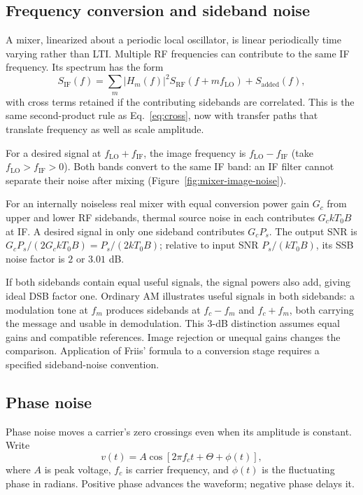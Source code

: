 \subsection{Frequency conversion and sideband noise}
A mixer, linearized about a periodic local oscillator, is linear periodically time varying rather than LTI. Multiple RF frequencies can contribute to the same IF frequency. Its spectrum has the form
\[
S_{\mathrm{IF}}(f)=\sum_m|H_m(f)|^2S_{\mathrm{RF}}(f+mf_{\mathrm{LO}})+S_{\mathrm{added}}(f),
\]
with cross terms retained if the contributing sidebands are correlated. This is the same second-product rule as Eq.~\eqref{eq:cross}, now with transfer paths that translate frequency as well as scale amplitude.

For a desired signal at $f_{\mathrm{LO}}+f_{\mathrm{IF}}$, the image frequency is $f_{\mathrm{LO}}-f_{\mathrm{IF}}$ (take $f_{\mathrm{LO}}>f_{\mathrm{IF}}>0$). Both bands convert to the same IF band: an IF filter cannot separate their noise after mixing (Figure~\ref{fig:mixer-image-noise}).
\MixerImageNoiseFigure

For an internally noiseless real mixer with equal conversion power gain $G_c$ from upper and lower RF sidebands, thermal source noise in each contributes $G_ckT_0B$ at IF. A desired signal in only one sideband contributes $G_cP_s$. The output SNR is $G_cP_s/(2G_ckT_0B)=P_s/(2kT_0B)$; relative to input SNR $P_s/(kT_0B)$, its SSB noise factor is $2$ or $3.01$ dB. 

If both sidebands contain equal useful signals, the signal powers also add, giving ideal DSB factor one. Ordinary AM illustrates useful signals in both sidebands: a modulation tone at $f_m$ produces sidebands at $f_c-f_m$ and $f_c+f_m$, both carrying the message and usable in demodulation. This $3$-dB distinction assumes equal gains and compatible references. Image rejection or unequal gains changes the comparison. Application of Friis' formula to a conversion stage requires a specified sideband-noise convention.

\subsection{Phase noise}
\label{sec:phase-noise}
Phase noise moves a carrier's zero crossings even when its amplitude is constant. Write
\[
v(t)=A\cos[2\pi f_ct+\Theta+\phi(t)],
\]
where $A$ is peak voltage, $f_c$ is carrier frequency, and $\phi(t)$ is the fluctuating phase in radians. Positive phase advances the waveform; negative phase delays it.

